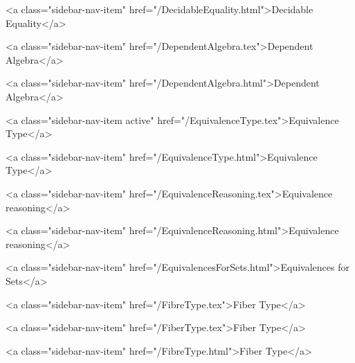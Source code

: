       
        
          <a class="sidebar-nav-item" href="/DecidableEquality.html">Decidable Equality</a>
        
      
    
      
        
          <a class="sidebar-nav-item" href="/DependentAlgebra.tex">Dependent Algebra</a>
        
      
    
      
        
          <a class="sidebar-nav-item" href="/DependentAlgebra.html">Dependent Algebra</a>
        
      
    
      
        
          <a class="sidebar-nav-item active" href="/EquivalenceType.tex">Equivalence Type</a>
        
      
    
      
        
          <a class="sidebar-nav-item" href="/EquivalenceType.html">Equivalence Type</a>
        
      
    
      
        
          <a class="sidebar-nav-item" href="/EquivalenceReasoning.tex">Equivalence reasoning</a>
        
      
    
      
        
          <a class="sidebar-nav-item" href="/EquivalenceReasoning.html">Equivalence reasoning</a>
        
      
    
      
        
          <a class="sidebar-nav-item" href="/EquivalencesForSets.html">Equivalences for Sets</a>
        
      
    
      
        
          <a class="sidebar-nav-item" href="/FibreType.tex">Fiber Type</a>
        
      
    
      
        
          <a class="sidebar-nav-item" href="/FiberType.tex">Fiber Type</a>
        
      
    
      
        
          <a class="sidebar-nav-item" href="/FibreType.html">Fiber Type</a>
        
